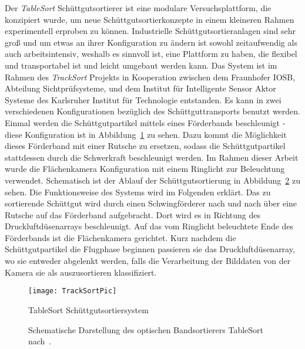 Der \textit{TableSort} Schüttgutsortierer ist eine modulare Versuchsplattform, die konzipiert wurde, um neue Schüttgutsortierkonzepte in einem kleineren Rahmen experimentell erproben zu können.
Industrielle Schüttgutsortieranlagen sind sehr groß und um etwas an ihrer Konfiguration zu ändern ist sowohl zeitaufwendig als auch arbeitsintensiv, 
weshalb es sinnvoll ist, eine Plattform zu haben, die flexibel und transportabel ist und leicht umgebaut werden kann.
Das System ist im Rahmen des \textit{TrackSort} Projekts in Kooperation zwischen dem Fraunhofer IOSB, Abteilung Sichtprüfsysteme, und dem Institut für Intelligente Sensor Aktor Systeme des Karlsruher Institut für Technologie entstanden\cite{doll2015}.
Es kann in zwei verschiedenen Konfigurationen bezüglich des Schüttguttransports benutzt werden.
Einmal werden die Schüttgutpartikel mittels eines Förderbands beschleunigt - diese Konfiguration ist in Abbildung~\ref{fig:tablesortsystem} zu sehen.
Dazu kommt die Möglichkeit dieses Förderband mit einer Rutsche zu ersetzen, sodass die Schüttgutpartikel stattdessen durch die Schwerkraft beschleunigt werden. 
Im Rahmen dieser Arbeit wurde die Flächenkamera Konfiguration mit einem Ringlicht zur Beleuchtung verwendet.
Schematisch ist der Ablauf der Schüttgutsortierung in Abbildung~\ref{fig:aufbau_tablesort} zu sehen.
Die Funktionsweise des Systems wird im Folgenden erklärt.
Das zu sortierende Schüttgut wird durch einen Schwingförderer nach und nach über eine Rutsche auf das Förderband aufgebracht.
Dort wird es in Richtung des Druckluftdüsenarrays beschleunigt. 
Auf das vom Ringlicht beleuchtete Ende des Förderbands ist die Flächenkamera gerichtet.
Kurz nachdem die Schüttgutpartikel die Flugphase beginnen passieren sie das Druckluftdüsenarray, wo sie entweder abgelenkt werden, 
falls die Verarbeitung der Bilddaten von der Kamera sie als auszusortieren klassifiziert.

\begin{figure}[h]
	\texttt{[image: TrackSortPic]}
	\caption{TableSort Schüttgutsortiersystem \cite{fraunhoferiosb2017}}
	\label{fig:tablesortsystem}
\end{figure}


\begin{figure}[h]
    \centering
    \def\svgwidth{\columnwidth}
	
	\caption[Schematische Darstellung des optischen Bandsortierers TableSort nach~\cite{Pfaff2017}.]{
		Schematische Darstellung des optischen Bandsortierers TableSort nach~\cite{Pfaff2017}.
	}
	\label{fig:aufbau_tablesort}

\end{figure}


